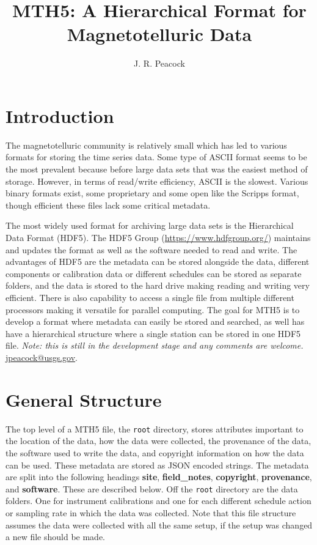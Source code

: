 \documentclass{article}
\title{\textbf{MTH5}: A Hierarchical Format for Magnetotelluric Data}
\author[1]{J. R. Peacock}
\affil[1]{U.S. Geological Survey}
\newcommand{\attr}[1]{\textbf{#1}}
\begin{document}
	
\maketitle

\tableofcontents

\newpage

\section{Introduction}

The magnetotelluric community is relatively small which has led to various formats for storing the time series data.  Some type of ASCII format seems to be the most prevalent because before large data sets that was the easiest method of storage.  However, in terms of read/write efficiency, ASCII is the slowest.  Various binary formats exist, some proprietary and some open like the Scripps format, though efficient these files lack some critical metadata. 

The most widely used format for archiving large data sets is the Hierarchical Data Format (HDF5).  The HDF5 Group (\url{https://www.hdfgroup.org/}) maintains and updates the format as well as the software needed to read and write.  The advantages of HDF5 are the metadata can be stored alongside the data, different components or calibration data or different schedules can be stored as separate folders, and the data is stored to the hard drive making reading and writing very efficient.  There is also capability to access a single file from multiple different processors making it versatile for parallel computing.  The goal for MTH5 is to develop a format where metadata can easily be stored and searched, as well has have a hierarchical structure where a single station can be stored in one HDF5 file.  \textit{Note: this is still in the development stage and any comments are welcome.} \url{jpeacock@usgs.gov}. 
 

\section{General Structure}

The top level of a MTH5 file, the \verb|root| directory, stores attributes important to the location of the data, how the data were collected, the provenance of the data, the software used to write the data, and copyright information on how the data can be used.  These metadata are stored as JSON encoded strings.  The metadata are split into the following headings \attr{site}, \attr{field\_notes}, \attr{copyright}, \attr{provenance}, and \attr{software}. These are described below. Off the \verb|root| directory are the data folders.  One for instrument calibrations and one for each different schedule action or sampling rate in which the data was collected. Note that this file structure assumes the data were collected with all the same setup, if the setup was changed a new file should be made.  
\end{document}
